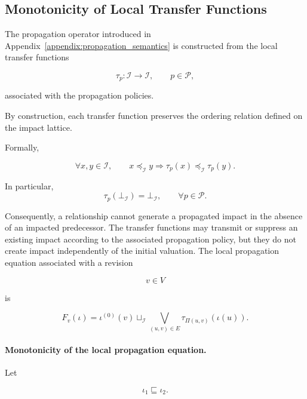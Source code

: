 \documentclass[10pt]{article}
\begin{document}
\subsection{Monotonicity of Local Transfer Functions}
\label{appendix:local_monotonicity}
The propagation operator introduced in
Appendix~\ref{appendix:propagation_semantics}
is constructed from the local transfer functions

\[
\tau_p :
\mathcal I
\rightarrow
\mathcal I,
\qquad
p\in\mathcal P,
\]

associated with the propagation policies.

By construction, each transfer function preserves the ordering relation defined
on the impact lattice.

Formally,

\begin{equation}
	\label{eq:transfer_monotone}
	\forall
	x,y
	\in
	\mathcal I,
	\qquad
	x
	\preceq_{\mathcal I}
	y
	\Longrightarrow
	\tau_p(x)
	\preceq_{\mathcal I}
	\tau_p(y).
\end{equation}

In particular,
\begin{equation}
	\tau_p
	\left(
	\bot_{\mathcal I}
	\right)
	=
	\bot_{\mathcal I},
	\qquad
	\forall p\in\mathcal P.
	\label{eq:transfer_bottom_preservation}
\end{equation}

Consequently, a relationship cannot generate a propagated impact in the absence of an impacted predecessor. The transfer functions may transmit or suppress an existing impact according to the associated propagation policy, but they do not create impact independently of the initial valuation.
The local propagation equation associated with a revision

\[
v\in V
\]

is

\begin{equation}
F_v(\iota)
=
\iota^{(0)}(v)
\sqcup_{\mathcal I}
\bigvee_{(u,v)\in E}
\tau_{\Pi(u,v)}
(
\iota(u)
).
\end{equation}

\paragraph{Monotonicity of the local propagation equation.}

Let

\begin{equation}
\iota_1
\sqsubseteq
\iota_2.
\end{equation}
\end{document}
